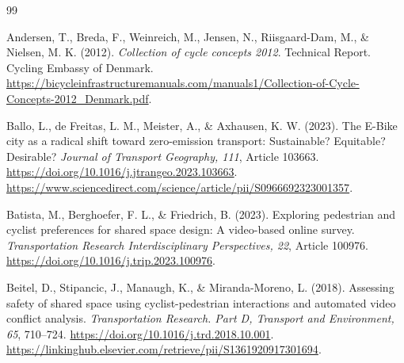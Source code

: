%
%

\begin{thebibliography}{99}
\setlength{\itemsep}{1pt plus 0.2pt}

Andersen, T., Breda, F., Weinreich, M., Jensen, N., Riisgaard-Dam, M., \&
Nielsen, M. K. (2012). \emph{Collection of cycle concepts 2012}. Technical
Report. Cycling Embassy of Denmark.
\url{https://bicycleinfrastructuremanuals.com/manuals1/Collection-of-Cycle-Concepts-2012_Denmark.pdf}.

Ballo, L., de Freitas, L. M., Meister, A., \& Axhausen, K. W. (2023). The E-Bike
city as a radical shift toward zero-emission transport: Sustainable? Equitable?
Desirable? \emph{Journal of Transport Geography, 111}, Article 103663.
\url{https://doi.org/10.1016/j.jtrangeo.2023.103663}.
\url{https://www.sciencedirect.com/science/article/pii/S0966692323001357}.

Batista, M., Berghoefer, F. L., \& Friedrich, B. (2023). Exploring pedestrian
and cyclist preferences for shared space design: A video-based online survey.
\emph{Transportation Research Interdisciplinary Perspectives, 22}, Article
100976. \url{https://doi.org/10.1016/j.trip.2023.100976}.

Beitel, D., Stipancic, J., Manaugh, K., \& Miranda-Moreno, L. (2018). Assessing
safety of shared space using cyclist-pedestrian interactions and automated video
conflict analysis. \emph{Transportation Research. Part D, Transport and
Environment, 65}, 710--724. \url{https://doi.org/10.1016/j.trd.2018.10.001}.
\url{https://linkinghub.elsevier.com/retrieve/pii/S1361920917301694}.


\end{thebibliography}
